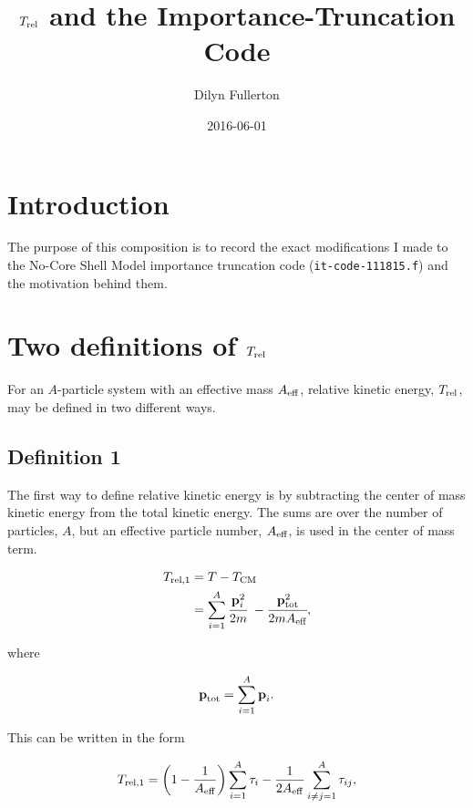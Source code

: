 \documentclass{article}
\begin{document}
\title{$T_{\rm{rel}}$ and the Importance-Truncation Code}
\author{Dilyn Fullerton}
\date{2016-06-01}
\maketitle

\section{Introduction}
The purpose of this composition is to record the exact modifications
I made to the No-Core Shell Model importance truncation code
(\texttt{it-code-111815.f}) and the motivation behind them.

\section{Two definitions of $T_{\rm{rel}}$}

For an $A$-particle system with an effective mass $A_{\rm{eff}}$,
relative kinetic energy, $T_{\rm{rel}}$, may be defined in two different
ways.

\subsection{Definition 1}

The first way to define relative kinetic energy is by subtracting
the center of mass kinetic energy from the total kinetic energy.
The sums are over the number of particles, $A$, but an effective
particle number, $A_{\rm{eff}}$, is used in the center of mass term.

\begin{equation*}
  \begin{aligned}
    T_{\rm{rel},1} &= T - T_{\rm{CM}} \\
    &= \displaystyle\sum_{i=1}^A \cfrac{\textbf{p}_i^2}{2m}
    ~- \cfrac{\textbf{p}_{\rm{tot}}^2}{2mA_{\rm{eff}}}, \\
  \end{aligned}
\end{equation*}

where

\begin{equation*}
  \textbf{p}_{\rm{tot}} = \displaystyle\sum_{i=1}^A \textbf{p}_i.
\end{equation*}

This can be written in the form

\begin{equation}\label{eq:def1}
  T_{\rm{rel},1} =
  \left(1-\frac{1}{A_{\rm{eff}}}\right) \displaystyle\sum_{i=1}^A\tau_i
  - \frac{1}{2A_{\rm{eff}}}
  \displaystyle\sum_{i\neq j=1}^A\tau_{ij},
\end{equation}
\end{document}
